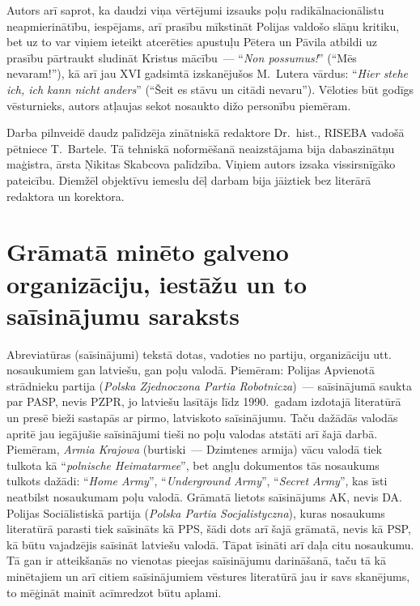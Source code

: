 \documentclass[twoside,a5paper,12pt,fleqn,openany]{extbook}
\newcommand{\pltxti}[1]{\textit{\textpolish{#1}}}
\newcommand{\detxti}[1]{\textit{\textgerman{#1}}}
\newcommand{\entxti}[1]{\textit{\textenglish{#1}}}
\newcommand{\latxti}[1]{\textit{\textlatin{#1}}}
\begin{document}
Autors arī saprot, ka daudzi viņa vērtējumi izsauks poļu radikālnacionālistu neapmierinātību, iespējams, arī prasību mīkstināt Polijas valdošo slāņu kritiku, bet uz to var viņiem ieteikt atcerēties apustuļu Pētera un Pāvila atbildi uz prasību pārtraukt sludināt Kristus mācību~--- ``\latxti{Non possumus!}” (``Mēs nevaram!”), kā arī jau XVI gadsimtā izskanējušos M.~Lutera vārdus: ``\detxti{Hier stehe ich, ich kann nicht anders}” (``Šeit es stāvu un citādi nevaru”).
Vēloties būt godīgs vēsturnieks, autors atļaujas sekot nosaukto dižo personību piemēram.

Darba pilnveidē daudz palīdzēja zinātniskā redaktore Dr.~hist., RISEBA vadošā pētniece T.~Bartele.
Tā tehniskā noformēšanā neaizstājama bija dabaszinātņu maģistra, ārsta Ņikitas Skabcova palīdzība.
Viņiem autors izsaka vissirsnīgāko pateicību.
Diemžēl objektīvu iemeslu dēļ darbam bija jāiztiek bez literārā redaktora un korektora.

\chapter*{Grāmatā minēto galveno organizāciju, iestāžu un to saīsinājumu saraksts}

Abreviatūras (saīsinājumi) tekstā dotas, vadoties no partiju, organizāciju utt. nosaukumiem gan latviešu, gan poļu valodā.
Piemēram: Polijas Apvienotā strādnieku partija (\pltxti{Polska Zjednoczona Partia Robotnicza})~--- saīsinājumā saukta par PASP, nevis PZPR, jo latviešu lasītājs līdz 1990.~gadam izdotajā literatūrā un presē bieži sastapās ar pirmo, latviskoto saīsinājumu.
Taču dažādās valodās apritē jau iegājušie saīsinājumi tieši no poļu valodas atstāti arī šajā darbā.
Piemēram, \pltxti{Armia Krajowa} (burtiski~--- Dzimtenes armija) vācu valodā tiek tulkota kā ``\detxti{polnische Heimatarmee}'', bet angļu dokumentos tās nosaukums tulkots dažādi: ``\entxti{Home Army}'', ``\entxti{Underground Army}'', ``\entxti{Secret Army}'', kas īsti neatbilst nosaukumam poļu valodā.
Grāmatā lietots saīsinājums AK, nevis DA.
Polijas Sociālistiskā partija (\pltxti{Polska Partia Socjalistyczna}), kuras nosaukums literatūrā parasti tiek saīsināts kā PPS, šādi dots arī šajā grāmatā, nevis kā PSP, kā būtu vajadzējis saīsināt latviešu valodā.
Tāpat īsināti arī daļa citu nosaukumu.
Tā gan ir atteikšanās no vienotas pieejas saīsinājumu darināšanā, taču tā kā minētajiem un arī citiem saīsinājumiem vēstures literatūrā jau ir savs skanējums, to mēģināt mainīt acīmredzot būtu aplami.
\end{document}
